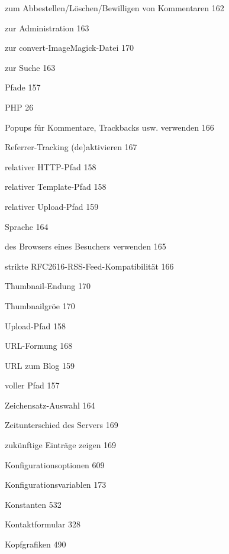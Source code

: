 \documentclass{book}
\renewcommand\subitem{\par}
\renewcommand\subsubitem{\par\hspace*{3mm}}
\begin{document}
\begin{multicols}{2}
\begin{osp-index}
      \subsubitem zum Abbestellen/L\"oschen/Bewilligen von Kommentaren\hspace{1mm} 
		162
      \subsubitem zur Administration\hspace{1mm} 163
      \subsubitem zur convert-ImageMagick-Datei\hspace{1mm} 170
      \subsubitem zur Suche\hspace{1mm} 163
    \subitem Pfade\hspace{1mm} 157
    \subitem PHP\hspace{1mm} 26
    \subitem Popups f\"ur Kommentare, Trackbacks usw. verwenden\hspace{1mm} 
		166
    \subitem Referrer-Tracking (de)aktivieren\hspace{1mm} 167
    \subitem relativer HTTP-Pfad\hspace{1mm} 158
    \subitem relativer Template-Pfad\hspace{1mm} 158
    \subitem relativer Upload-Pfad\hspace{1mm} 159
    \subitem Sprache\hspace{1mm} 164
      \subsubitem des Browsers eines Besuchers verwenden\hspace{1mm} 
		165
    \subitem strikte RFC2616-RSS-Feed-Kompatibilit\"at\hspace{1mm} 166
    \subitem Thumbnail-Endung\hspace{1mm} 170
    \subitem Thumbnailgr\"o\IeC {\ss }e\hspace{1mm} 170
    \subitem Upload-Pfad\hspace{1mm} 158
    \subitem URL-Formung\hspace{1mm} 168
    \subitem URL zum Blog\hspace{1mm} 159
    \subitem voller Pfad\hspace{1mm} 157
    \subitem Zeichensatz-Auswahl\hspace{1mm} 164
    \subitem Zeitunterschied des Servers\hspace{1mm} 169
    \subitem zuk\"unftige Eintr\"age zeigen\hspace{1mm} 169
  \item Konfigurationsoptionen\hspace{1mm} 609
  \item Konfigurationsvariablen\hspace{1mm} 173
  \item Konstanten\hspace{1mm} 532
  \item Kontaktformular\hspace{1mm} 328
  \item Kopfgrafiken\hspace{1mm} 490


\end{osp-index}
\end{multicols}
\end{document}
